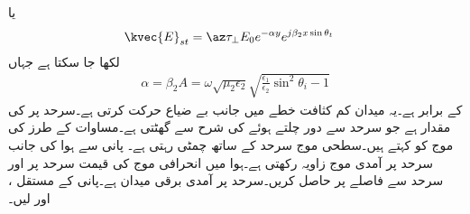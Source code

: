 یا
\begin{align}\label{مساوات_ترچھی_سطحی_موج}
\kvec{E}_{st} &=\az \tau_{\perp} E_0 e^{-\alpha y}e^{j \beta_2 x \sin \theta_t}
\end{align}
لکھا جا سکتا ہے جہاں
\begin{align}
\alpha=\beta_2 A =\omega \sqrt{\mu_2 \epsilon_2} \sqrt{\frac{\epsilon_1}{\epsilon_2}\sin^2 \theta_i -1}
\end{align}
کے برابر ہے۔یہ میدان کم کثافت خطے میں  جانب بے ضیاع حرکت کرتی ہے۔سرحد پر  کی مقدار  ہے جو سرحد سے دور چلتے ہوئے  کی شرح سے گھٹتی ہے۔مساوات  کے طرز کی موج کو  کہتے ہیں۔سطحی موج سرحد کے ساتھ چمٹی رہتی ہے۔ 
پانی سے ہوا کی جانب سرحد پر آمدی موج  زاویہ رکھتی ہے۔ہوا میں انحرافی موج کی قیمت سرحد پر اور سرحد سے  فاصلے پر حاصل کریں۔سرحد پر آمدی برقی میدان  ہے۔پانی کے مستقل ،  اور  لیں۔ 

